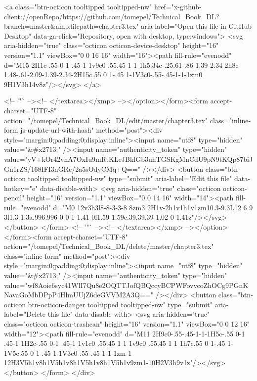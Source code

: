         <a class="btn-octicon tooltipped tooltipped-nw"
           href="x-github-client://openRepo/https://github.com/tomepel/Technical_Book_DL?branch=master&amp;filepath=chapter3.tex"
           aria-label="Open this file in GitHub Desktop"
           data-ga-click="Repository, open with desktop, type:windows">
            <svg aria-hidden="true" class="octicon octicon-device-desktop" height="16" version="1.1" viewBox="0 0 16 16" width="16"><path fill-rule="evenodd" d="M15 2H1c-.55 0-1 .45-1 1v9c0 .55.45 1 1 1h5.34c-.25.61-.86 1.39-2.34 2h8c-1.48-.61-2.09-1.39-2.34-2H15c.55 0 1-.45 1-1V3c0-.55-.45-1-1-1zm0 9H1V3h14v8z"/></svg>
        </a>

        <!-- '"` --><!-- </textarea></xmp> --></option></form><form accept-charset="UTF-8" action="/tomepel/Technical_Book_DL/edit/master/chapter3.tex" class="inline-form js-update-url-with-hash" method="post"><div style="margin:0;padding:0;display:inline"><input name="utf8" type="hidden" value="&#x2713;" /><input name="authenticity_token" type="hidden" value="yV+kOr42vhA7OxIu9mRtKLeJBklGb3uhTGSKgMnCdU9pN9tKQp87biJGn1rZS/168IFI3nGRc/2a5sOdyCMq+Q==" /></div>
          <button class="btn-octicon tooltipped tooltipped-nw" type="submit"
            aria-label="Edit this file" data-hotkey="e" data-disable-with>
            <svg aria-hidden="true" class="octicon octicon-pencil" height="16" version="1.1" viewBox="0 0 14 16" width="14"><path fill-rule="evenodd" d="M0 12v3h3l8-8-3-3-8 8zm3 2H1v-2h1v1h1v1zm10.3-9.3L12 6 9 3l1.3-1.3a.996.996 0 0 1 1.41 0l1.59 1.59c.39.39.39 1.02 0 1.41z"/></svg>
          </button>
</form>        <!-- '"` --><!-- </textarea></xmp> --></option></form><form accept-charset="UTF-8" action="/tomepel/Technical_Book_DL/delete/master/chapter3.tex" class="inline-form" method="post"><div style="margin:0;padding:0;display:inline"><input name="utf8" type="hidden" value="&#x2713;" /><input name="authenticity_token" type="hidden" value="wf8Aoie6syc41WlI7Qu8e2OQTTJofQBQccyBCPWFovvcoZhOCg9PGnKNavaGoMbDPpP4HlmUUjZ6deGVVM2A3Q==" /></div>
          <button class="btn-octicon btn-octicon-danger tooltipped tooltipped-nw" type="submit"
            aria-label="Delete this file" data-disable-with>
            <svg aria-hidden="true" class="octicon octicon-trashcan" height="16" version="1.1" viewBox="0 0 12 16" width="12"><path fill-rule="evenodd" d="M11 2H9c0-.55-.45-1-1-1H5c-.55 0-1 .45-1 1H2c-.55 0-1 .45-1 1v1c0 .55.45 1 1 1v9c0 .55.45 1 1 1h7c.55 0 1-.45 1-1V5c.55 0 1-.45 1-1V3c0-.55-.45-1-1-1zm-1 12H3V5h1v8h1V5h1v8h1V5h1v8h1V5h1v9zm1-10H2V3h9v1z"/></svg>
          </button>
</form>  </div>

